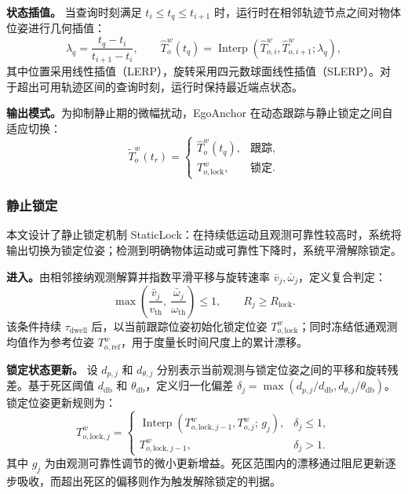 \documentclass[review]{vgtc}
\begin{document}
\textbf{状态插值。}
当查询时刻满足 $t_i\leq t_q\leq t_{i+1}$ 时，运行时在相邻轨迹节点之间对物体位姿进行几何插值：
\begin{equation}
\lambda_q = \frac{t_q - t_i}{t_{i+1} - t_i}, \qquad
\widehat{T}_o^w(t_q) = \operatorname{Interp}(\widehat{T}_{o,i}^{w}, \widehat{T}_{o,i+1}^{w}; \lambda_q),
\label{eq:history-interp}
\end{equation}
其中位置采用线性插值（LERP），旋转采用四元数球面线性插值（SLERP）。对于超出可用轨迹区间的查询时刻，运行时保持最近端点状态。

\textbf{输出模式。}为抑制静止期的微幅扰动，EgoAnchor 在动态跟踪与静止锁定之间自适应切换：
\begin{equation}
\widetilde{T}_o^w(t_r) = \begin{cases}
\widehat{T}_o^w(t_q), & \text{跟踪}, \\
T_{o,\mathrm{lock}}^w, & \text{锁定}.
\end{cases}
\label{eq:staticlock}
\end{equation}

\subsubsection{静止锁定}\label{sec:staticlock}

本文设计了静止锁定机制 StaticLock：在持续低运动且观测可靠性较高时，系统将输出切换为锁定位姿；检测到明确物体运动或可靠性下降时，系统平滑解除锁定。

\textbf{进入。}由相邻接纳观测解算并指数平滑平移与旋转速率 $\bar v_j,\bar\omega_j$，定义复合判定：
\begin{equation}
\max\left(\frac{\bar{v}_j}{v_{\mathrm{th}}},\ \frac{\bar{\omega}_j}{\omega_{\mathrm{th}}}\right) \leq 1, \qquad R_j \geq R_{\mathrm{lock}}.
\label{eq:lock-entry}
\end{equation}
该条件持续 $\tau_{\mathrm{dwell}}$ 后，以当前跟踪位姿初始化锁定位姿 $T_{o,\mathrm{lock}}^w$；同时冻结低通观测均值作为参考位姿 $T_{o,\mathrm{ref}}^w$，用于度量长时间尺度上的累计漂移。

\textbf{锁定状态更新。}
设 $d_{p,j}$ 和 $d_{\theta,j}$ 分别表示当前观测与锁定位姿之间的平移和旋转残差。基于死区阈值 $d_{\mathrm{db}}$ 和 $\theta_{\mathrm{db}}$，定义归一化偏差 $\delta_j=\max(d_{p,j}/d_{\mathrm{db}},d_{\theta,j}/\theta_{\mathrm{db}})$。锁定位姿更新规则为：
\begin{equation}
T_{o,\mathrm{lock},j}^w =
\begin{cases}
\operatorname{Interp}\left(T_{o,\mathrm{lock},j-1}^w, T_{o,j}^{w};\, g_j\right), & \delta_j \leq 1, \\
T_{o,\mathrm{lock},j-1}^w, & \delta_j > 1.
\end{cases}
\label{eq:lock-update}
\end{equation}
其中 $g_j$ 为由观测可靠性调节的微小更新增益。死区范围内的漂移通过阻尼更新逐步吸收，而超出死区的偏移则作为触发解除锁定的判据。
\end{document}
